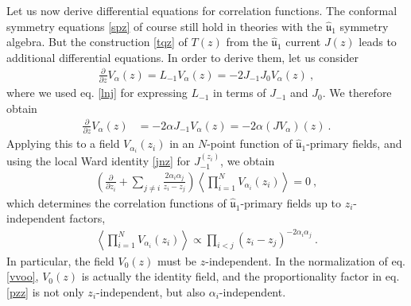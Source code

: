 \documentclass[12pt, a4paper, notitlepage, twoside]{report}
\numberwithin{equation}{section}
\theoremstyle{break}
\begin{document}
Let us now derive differential equations for correlation functions.
The conformal symmetry equations \eqref{spz} of course still hold in theories with the $\hat{\mathfrak{u}}_1$ symmetry algebra.
But the construction \eqref{tqz} of $T(z)$ from the $\hat{\mathfrak{u}}_1$ current $J(z)$ leads to additional differential equations.
In order to derive them, let us consider 
\begin{align}
 {\frac{\partial}{\partial z}} V_{\alpha}(z) = L_{-1}V_\alpha(z) = -2J_{-1}J_0 V_\alpha(z)\ ,
\end{align}
where we used eq. \eqref{lnj} for expressing $L_{-1}$ in terms of $J_{-1}$ and $J_0$.
We therefore obtain
\begin{align}
{\frac{\partial}{\partial z}} V_{\alpha}(z)&= -2\alpha J_{-1}V_\alpha(z) = -2\alpha(JV_\alpha)(z)\ .
\label{pvaj}
\end{align}
Applying this to a field $V_{\alpha_i}(z_i)$ in an 
$N$-point function of $\hat{\mathfrak{u}}_1$-primary fields, and using 
the local Ward identity \eqref{jnz} for $J_{-1}^{(z_i)}$, we obtain 
\begin{align}
\left( {\frac{\partial}{\partial z_i}} +\sum_{j\neq i} \frac{2\alpha_i\alpha_j}{z_i-z_j} \right) \left\langle \prod_{i=1}^N V_{\alpha_i}(z_i) \right\rangle = 0 \ ,
\label{kzl}
\end{align}
which determines the correlation functions of $\hat{\mathfrak{u}}_1$-primary fields up to $z_i$-independent factors, 
\begin{align}
 \boxed{\left\langle \prod_{i=1}^N V_{\alpha_i}(z_i)\right\rangle  \propto \prod_{i<j} (z_i-z_j)^{-2\alpha_i\alpha_j}}\ .
\label{pzz}
\end{align}
In particular, the field $V_0(z)$ must be $z$-independent.
In the normalization of eq. \eqref{vvoo}, $V_0(z)$ is actually the identity field, and the proportionality factor in eq. \eqref{pzz} is not only $z_i$-independent, but also $\alpha_i$-independent.
\end{document}
